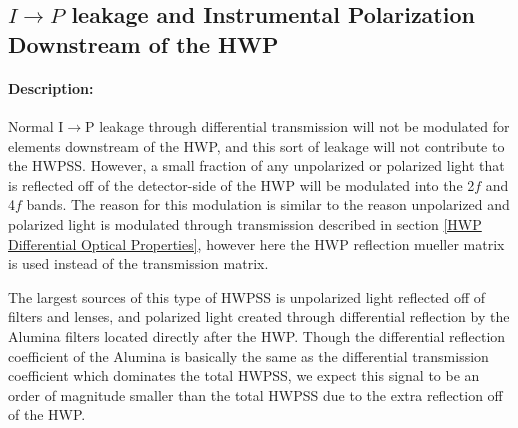 \subsection{$I\rightarrow P$ leakage and Instrumental Polarization Downstream of the HWP}
\label{IP downstream of HWP}
\paragraph{Description:}
Normal I$\rightarrow$P leakage through differential transmission will not be modulated for elements downstream of the HWP, and this sort of leakage will not contribute to the HWPSS. 
However, a small fraction of any unpolarized or polarized light that is reflected off of the detector-side of the HWP will be modulated into the 2$f$ and 4$f$ bands.
The reason for this modulation is similar to the reason unpolarized and polarized light is modulated through transmission described in section \ref{HWP Differential Optical Properties}, however here the HWP reflection mueller matrix is used instead of the transmission matrix.

The largest sources of this type of HWPSS is unpolarized light reflected off of filters and lenses, and polarized light created through differential reflection by the Alumina filters located directly after the HWP. 
Though the differential reflection coefficient of the Alumina is basically the same as the differential transmission coefficient which dominates the total HWPSS, we expect this signal to be an order of magnitude smaller than the total HWPSS due to the extra reflection off of the HWP.







